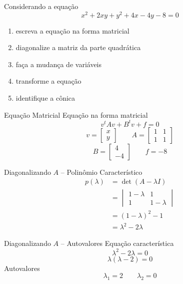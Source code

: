 \begin{question}
  Considerando a equação
  \[
    x^2+2xy+y^2+4x-4y-8=0
  \]
  \vspace{-\baselineskip}
  \begin{enumerate}
    \item escreva a equação na forma matricial
    \item diagonalize a matriz da parte quadrática
    \item faça a mudança de variáveis
    \item transforme a equação
    \item identifique a cônica
  \end{enumerate}
\end{question}

\begin{resolution}{Equação Matricial}
  Equação na forma matricial
  \[
    v^tAv+B^tv+f=0
  \]
  \[
    v=\begin{bmatrix}x\\y\end{bmatrix}
    \qquad
    A=\begin{bmatrix}
      1&1\\
      1&1
    \end{bmatrix}
  \]
  \[
    B=\begin{bmatrix}4\\-4\end{bmatrix}
    \qquad
    f=-8
  \]
\end{resolution}

\begin{resolution}{Diagonalizando $A$ -- Polinômio Característico}
  \begin{align*}
    p(\lambda)
    & = \det(A-\lambda I)
    \\
    & = \begin{vmatrix}
      1-\lambda&1\\
      1&1-\lambda
    \end{vmatrix}
    \\
    & = (1-\lambda)^2-1
    \\
    & = \lambda^2-2\lambda
  \end{align*}
\end{resolution}

\begin{resolution}{Diagonalizando $A$ -- Autovalores}
  Equação característica
  \[
    \lambda^2-2\lambda=0
  \]
  \[
    \lambda(\lambda-2)=0
  \]
  Autovalores
  \[
    \lambda_1=2
    \qquad
    \lambda_2=0
  \]
\end{resolution}


